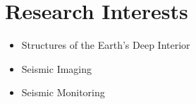 \section{Research Interests}

\begin{itemize}
\item Structures of the Earth’s Deep Interior
\item Seismic Imaging
\item Seismic Monitoring
\end{itemize}

